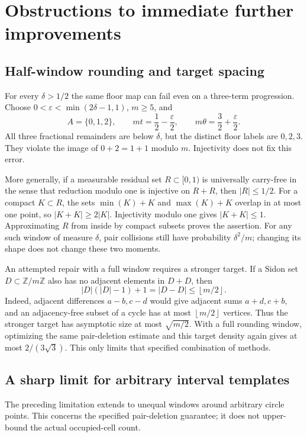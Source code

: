 \documentclass[11pt]{article}
\theoremstyle{definition}
\theoremstyle{remark}
\newcommand{\Z}{\mathbb Z}
\newcommand{\floor}[1]{\left\lfloor #1\right\rfloor}
\begin{document}
\section{Obstructions to immediate further improvements}

\subsection{Half-window rounding and target spacing}

For every $\delta>1/2$ the same floor map can fail even on a three-term
progression. Choose $0<\varepsilon<\min(2\delta-1,1)$, $m\ge5$, and
\[
A=\{0,1,2\},\qquad mt=\frac12-\frac\varepsilon2,
\qquad m\theta=\frac32+\frac\varepsilon2.
\]
All three fractional remainders are below $\delta$, but the distinct
floor labels are $0,2,3$. They violate the image of $0+2=1+1$ modulo
$m$. Injectivity does not fix this error.

More generally, if a measurable residual set $R\subset[0,1)$ is
universally carry-free in the sense that reduction modulo one is
injective on $R+R$, then $|R|\le1/2$. For a compact $K\subset R$,
the sets $\min(K)+K$ and $\max(K)+K$ overlap in at most one point,
so $|K+K|\ge2|K|$. Injectivity modulo one gives $|K+K|\le1$.
Approximating $R$ from inside by compact subsets proves the assertion.
For any such window of measure $\delta$, pair collisions still have
probability $\delta^2/m$; changing its shape does not change these
two moments.

An attempted repair with a full window requires a stronger target.
If a Sidon set $D\subset\Z/m\Z$ also has no adjacent elements in
$D+D$, then
\[
|D|(|D|-1)+1=|D-D|\le\floor{m/2}.
\]
Indeed, adjacent differences $a-b,c-d$ would give adjacent sums
$a+d,c+b$, and an adjacency-free subset of a cycle has at most
$\floor{m/2}$ vertices. Thus the stronger target has asymptotic size
at most $\sqrt{m/2}$. With a full rounding window, optimizing the same
pair-deletion estimate and this target density again gives at most
$2/(3\sqrt3)$. This only limits that specified combination of methods.

\subsection{A sharp limit for arbitrary interval templates}

The preceding limitation extends to unequal windows around arbitrary
circle points. This concerns the specified pair-deletion guarantee;
it does not upper-bound the actual occupied-cell count.
\end{document}
